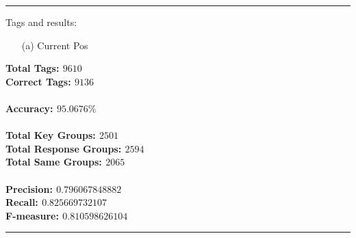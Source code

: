 \noindent\rule{15cm}{0.4pt}
Tags and results:
\begin{itemize}
\item[(a)] Current Pos
\end{itemize}
\large{
\textbf{Total Tags: $9610$} \\
\textbf{Correct Tags: $9136$} \\
\\
\textbf{Accuracy: $95.0676\%$} \\
\\
\textbf{Total Key Groups: $2501$} \\
\textbf{Total Response Groups: $2594$} \\
\textbf{Total Same Groups: $2065$} \\
\\
\textbf{Precision: $0.796067848882$} \\
\textbf{Recall: $0.825669732107$} \\
\textbf{F-measure: $0.810598626104$} \\
}

\noindent\rule{15cm}{0.4pt}
